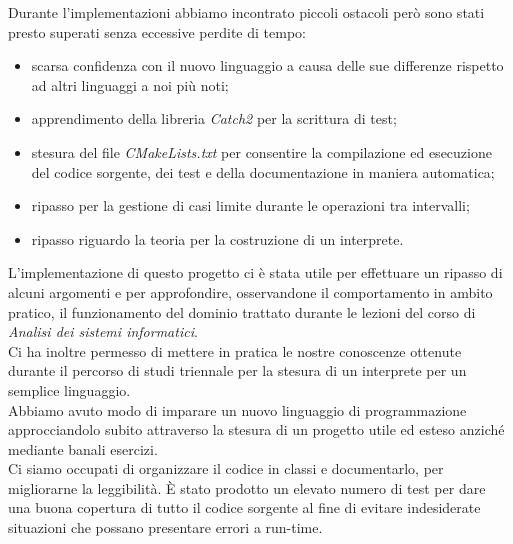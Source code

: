 \documentclass[a4paper, 10pt]{report}
\begin{document}
\noindent
Durante l'implementazioni abbiamo incontrato piccoli ostacoli però sono stati presto superati senza eccessive perdite di tempo:
\begin{itemize}
	\item scarsa confidenza con il nuovo linguaggio a causa delle sue differenze rispetto ad altri linguaggi a noi più noti;
	\item apprendimento della libreria \textit{Catch2} per la scrittura di test;
	\item stesura del file \textit{CMakeLists.txt} per consentire la compilazione ed esecuzione del codice sorgente, dei test e della documentazione in maniera automatica;
	\item ripasso per la gestione di casi limite durante le operazioni tra intervalli;
	\item ripasso riguardo la teoria per la costruzione di un interprete.
	\\
\end{itemize}

\noindent
L'implementazione di questo progetto ci è stata utile per effettuare un ripasso di alcuni argomenti e per approfondire, osservandone il comportamento in ambito pratico, il funzionamento del dominio trattato durante le lezioni del corso di \textit{Analisi dei sistemi informatici}.\\
Ci ha inoltre permesso di mettere in pratica le nostre conoscenze ottenute durante il percorso di studi triennale per la stesura di un interprete per un semplice linguaggio.\\
Abbiamo avuto modo di imparare un nuovo linguaggio di programmazione approcciandolo subito attraverso la stesura di un progetto utile ed esteso anziché mediante banali esercizi.\\
Ci siamo occupati di organizzare il codice in classi e documentarlo, per migliorarne la leggibilità. È stato prodotto un elevato numero di test per dare una buona copertura di tutto il codice sorgente al fine di evitare indesiderate situazioni che possano presentare errori a run-time.
\end{document}
